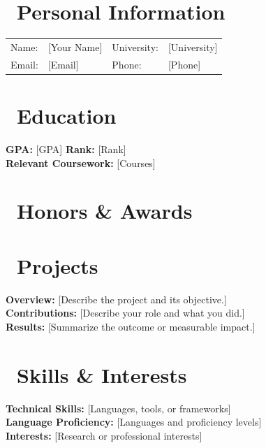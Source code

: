 \documentclass{resume}
\begin{document}
\renewcommand{\arraystretch}{1.2}

\section*{\faGraduationCap\ Personal Information}
\begin{tabularx}{\linewidth}{@{}lX lX@{}}
    Name:  & [Your Name] & University: & [University] \\
    Email: & [Email]     & Phone:      & [Phone] \\
\end{tabularx}

\section{\faHome\ Education}
\datedsubsection{\textbf{[University]}}{[City]}
\textbf{GPA:} [GPA] \qquad \textbf{Rank:} [Rank] \\
\textbf{Relevant Coursework:} [Courses]

\section{\faHeartO\ Honors \& Awards}

\section{\faUsers\ Projects}
\textbf{Overview:} [Describe the project and its objective.] \\
\textbf{Contributions:} [Describe your role and what you did.] \\
\textbf{Results:} [Summarize the outcome or measurable impact.]

\section{\faCogs\ Skills \& Interests}
\textbf{Technical Skills:} [Languages, tools, or frameworks] \\
\textbf{Language Proficiency:} [Languages and proficiency levels] \\
\textbf{Interests:} [Research or professional interests]
\end{document}
